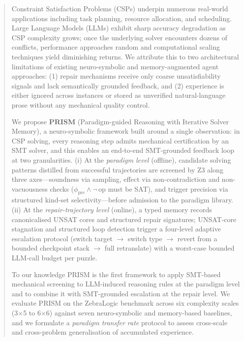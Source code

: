 \begin{abstract}
Constraint Satisfaction Problems (CSPs) underpin numerous real-world applications including task planning, resource allocation, and scheduling. Large Language Models (LLMs) exhibit sharp accuracy degradation as CSP complexity grows; once the underlying solver encounters dozens of conflicts, performance approaches random and computational scaling techniques yield diminishing returns. We attribute this to two architectural limitations of existing neuro-symbolic and memory-augmented agent approaches: (1) repair mechanisms receive only coarse unsatisfiability signals and lack semantically grounded feedback, and (2) experience is either ignored across instances or stored as unverified natural-language prose without any mechanical quality control.

We propose \textbf{PRISM} (Paradigm-guided Reasoning with Iterative Solver Memory), a neuro-symbolic framework built around a single observation: in CSP solving, every reasoning step admits mechanical certification by an SMT solver, and this enables an end-to-end SMT-grounded feedback loop at two granularities. (i) At the \emph{paradigm level} (offline), candidate solving patterns distilled from successful trajectories are screened by Z3 along three axes—soundness via sampling, effect via non-contradiction and non-vacuousness checks ($\phi_{\text{pre}} \wedge \neg\,\text{op}$ must be SAT), and trigger precision via structured kind-set selectivity—before admission to the paradigm library. (ii) At the \emph{repair-trajectory level} (online), a typed memory records canonicalised UNSAT cores and structured repair signatures; UNSAT-core stagnation and structured loop detection trigger a four-level adaptive escalation protocol (switch target $\to$ switch type $\to$ revert from a bounded checkpoint stack $\to$ full retranslate) with a worst-case bounded LLM-call budget per puzzle.

To our knowledge PRISM is the first framework to apply SMT-based mechanical screening to LLM-induced reasoning rules at the paradigm level and to combine it with SMT-grounded escalation at the repair level. We evaluate PRISM on the ZebraLogic benchmark across six complexity scales (3$\times$5 to 6$\times$6) against seven neuro-symbolic and memory-based baselines, and we formulate a \emph{paradigm transfer rate} protocol to assess cross-scale and cross-problem generalisation of accumulated experience.
\end{abstract}
